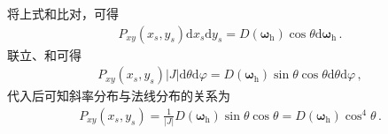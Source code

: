 将上式和比对，可得
\begin{align}\label{eq:08-ex01-P2D}
    P_{xy}(x_s,y_s)\mathrm{d}x_s\mathrm{d}y_s=
    D({\bm\omega}_{\mathrm{h}})\cos\theta\mathrm{d}{\bm\omega}_{\mathrm{h}}\, .
\end{align}
联立、和可得
\begin{align}
    P_{xy}(x_s,y_s)|J|\mathrm{d}\theta\mathrm{d}\varphi
    =D({\bm\omega}_{\mathrm{h}})\sin\theta\cos\theta\mathrm{d}\theta\mathrm{d}\varphi\, ,
\end{align}
代入后可知斜率分布与法线分布的关系为
\begin{align}
    P_{xy}(x_s,y_s)=\frac{1}{|J|}D({\bm\omega}_{\mathrm{h}})\sin\theta\cos\theta
    =D({\bm\omega}_{\mathrm{h}})\cos^4\theta\, .
\end{align}

